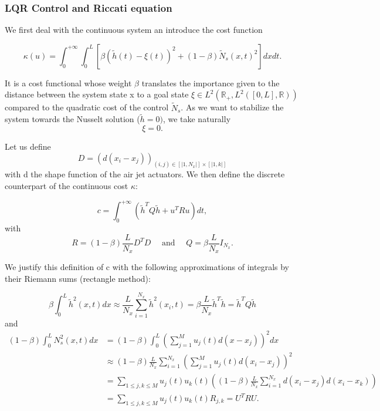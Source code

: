 \documentclass[12pt]{article}
\begin{document}
\subsubsection{LQR Control and Riccati equation}
We first deal with the continuous system an introduce the cost function 

\begin{equation}
    \kappa(u) = \int_0^{+\infty}\int_0^L \left[\beta (\tilde{h}(t)-\xi(t))^2+ (1-\beta)\tilde{N}_s(x,t)^2\right]dxdt.
\end{equation}

It is a cost functional whose weight $\beta$ translates the importance given to the distance between the system state x to a goal state $\xi \in L^2(\mathbb{R}_+, L^2([0,L],\mathbb{R}))$ compared to the quadratic cost of the control
$\tilde{N}_s$. As we want to stabilize the system towards the Nusselt solution ($\tilde{h}=0)$, we take naturally $$\xi = 0.$$




Let us define $$D=(d(x_i-x_j))_{(i,j)\in [|1,N_x|]\times [|1,k|]}$$ with d the shape function of the air jet actuators. We then define the discrete counterpart of the continuous cost $\kappa$: 

\begin{equation}\label{eq_LQR_discrete_cost}
\boxed{
    c = \int_0^{+\infty}(\tilde{h}^TQ\tilde{h}+u^TRu)dt},
\end{equation}
with 
\begin{equation}\label{eq_LQR_discrete_cost_matrices}
   R=(1-\beta)\frac{L}{N_x}D^TD\quad \text{ and } \quad  Q=\beta \frac{L}{N_x}I_{N_x}.
\end{equation}

We justify this definition of c with the following approximations of integrals by their Riemann sums (rectangle method):

$$\beta\int_0^L\tilde{h}^2(x,t)dx \boxed{\approx} \frac{L}{N_x}\sum_{i=1}^{N_x}\tilde{h}^2(x_i,t) = \beta\frac{L}{N_x}\tilde{h}^T\tilde{h}=\tilde{h}^TQ\tilde{h}$$
and 
\begin{align*} (1-\beta)\int_0^L N_s^2(x, t)dx &= (1-\beta)\int_0^L(\sum_{j=1}^{M}u_j(t)d(x-x_j))^2dx \\ &\boxed{\approx} (1-\beta)\frac{L}{N_x}\sum_{i=1}^{N_x}(\sum_{j=1}^{M}u_j(t)d(x_i-x_j))^2 \\&= \sum_{1\leq j, k\leq M}u_j(t)u_k(t)((1-\beta)\frac{L}{N_x}\sum_{i=1}^{N_x}d(x_i-x_j)d(x_i-x_k)) \\ &= \sum_{1\leq j, k\leq M}u_j(t)u_k(t) R_{j,k} = U^TRU.\end{align*}
\end{document}
